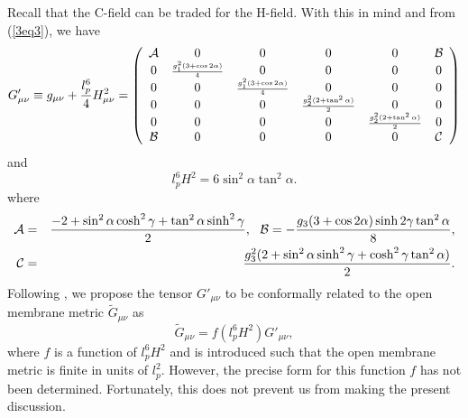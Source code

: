 \documentclass[a4paper,12pt]{article}
\begin{document}
Recall that the C-field can be traded for the H-field. With this in mind and
from (\ref{3eq3}), we have 
\begin{equation}
\label{3eq5}
G_{\mu\nu}' \equiv  g_{\mu\nu} +\frac{l_p^6}{4}H^2_{\mu\nu}= 
 \left (
\begin{array}{cccccc}
{\cal A} 
 &0&0&0&0& 
{\cal B} \\
0& {\scriptstyle \frac{g_1^2(3+\cos2\alpha)}{4}} &0&0&0&0 \\
0&0& {\scriptstyle \frac{g_1^2(3+\cos2\alpha)}{4}} &0&0&0 \\
0&0&0& {\scriptstyle \frac{g_2^2(2 +\tan^2\alpha)}{2}}&0&0 \\
0&0&0&0& {\scriptstyle \frac{g_2^2(2+\tan^2\alpha)}{2}}&0 \\
{\cal B} &0&0&0&0& {\cal C}
\end{array} \right ) 
\end{equation}
and 
\begin{equation}
\label{3eq6}
l_p^6 H^2 = 6 \sin^2\alpha \tan^2\alpha.
\end{equation}
where 
\begin{eqnarray}
\label{3eq7}
{\cal A} &=& \frac{-2 +\sin^2\alpha \cosh^2\gamma
      +\tan^2\alpha \sinh^2\gamma} {2}, \ \
{\cal B} =  -\frac{g_3(3+\cos2\alpha) \sinh 2\gamma 
 \tan^2\alpha}{8}, \nonumber \\ 
{\cal C} &=& \frac{g_3^2(2+\sin^2\alpha \sinh^2\gamma 
   +\cosh^2\gamma \tan^2\alpha)}{2}.
\end{eqnarray}
Following \cite{Berg2}, we propose the tensor $G'_{\mu\nu}$ to 
be conformally related to the open
membrane metric $\tilde{G}_{\mu\nu}$ as 
\begin{equation}
\label{3eq8}
\tilde{G}_{\mu\nu} =f(l_p^6 H^2) G'_{\mu\nu},
\end{equation}
where $f$ is a function of $l_p^6H^2$ and is introduced such that the open
membrane metric is finite in units of $l^2_p$. However, the precise form
for this function $f$ has not been determined. Fortunately, this does
not prevent us from making the present discussion. 
\end{document}
